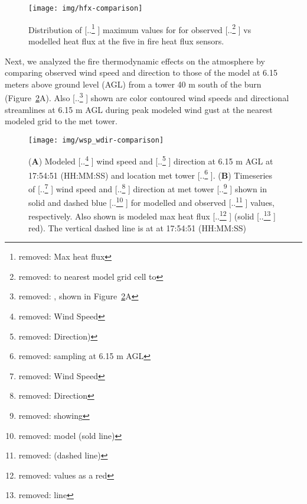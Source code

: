 \documentclass[preprints,article,accept,moreauthors,pdftex]{Definitions/mdpi}
\providecommand{\DIFadd}[1]{{\protect\color{blue} \sf #1}} %
\providecommand{\DIFdel}[1]{{\protect\color{red} [..\footnote{removed: #1} ]}} %
\providecommand{\DIFaddbegin}{} %
\providecommand{\DIFaddend}{} %
\providecommand{\DIFdelbegin}{} %
\providecommand{\DIFdelend}{} %
\providecommand{\DIFaddFL}[1]{\DIFadd{#1}} %
\providecommand{\DIFdelFL}[1]{\DIFdel{#1}} %
\providecommand{\DIFaddbeginFL}{} %
\providecommand{\DIFaddendFL}{} %
\providecommand{\DIFdelbeginFL}{} %
\providecommand{\DIFdelendFL}{} %
\begin{document}
\begin{figure}[H]
\centering
 \texttt{[image: img/hfx-comparison]}
 \caption{Distribution of \DIFdelbeginFL \DIFdelFL{Max heat flux }\DIFdelendFL \DIFaddbeginFL \DIFaddFL{maximum values }\DIFaddendFL for \DIFaddbeginFL \DIFaddFL{for }\DIFaddendFL observed \DIFdelbeginFL \DIFdelFL{to nearest model grid cell to }\DIFdelendFL \DIFaddbeginFL \DIFaddFL{vs modelled heat flux at }\DIFaddendFL the five in fire heat flux sensors.\label{fig6}}
 \end{figure}

Next, we analyzed the fire thermodynamic effects on the atmosphere by comparing observed wind speed and direction to those of the model at 6.15 meters above ground level (AGL) from a tower 40 m south of the burn (Figure~\ref{fig7}A). Also \DIFdelbegin \DIFdel{, shown in Figure~\ref{fig7}A }\DIFdelend \DIFaddbegin \DIFadd{shown }\DIFaddend are color contoured wind speeds and directional streamlines at 6.15 m AGL during peak modeled wind gust at the nearest modeled grid to the met tower.

\begin{figure}[H]
\centering
 \texttt{[image: img/wsp\_wdir-comparison]}
 \caption{(\textbf{A}) Modeled \DIFdelbeginFL \DIFdelFL{Wind Speed }\DIFdelendFL \DIFaddbeginFL \DIFaddFL{wind speed }\DIFaddendFL and \DIFdelbeginFL \DIFdelFL{Direction) }\DIFdelendFL \DIFaddbeginFL \DIFaddFL{direction at }\DIFaddendFL 6.15 m AGL at 17:54:51 (HH:MM:SS) and location met tower\DIFdelbeginFL \DIFdelFL{sampling at 6.15 m AGL}\DIFdelendFL . (\textbf{B}) Timeseries of \DIFdelbeginFL \DIFdelFL{Wind Speed }\DIFdelendFL \DIFaddbeginFL \DIFaddFL{wind speed }\DIFaddendFL and \DIFdelbeginFL \DIFdelFL{Direction }\DIFdelendFL \DIFaddbeginFL \DIFaddFL{direction }\DIFaddendFL at met tower \DIFdelbeginFL \DIFdelFL{showing }\DIFdelendFL \DIFaddbeginFL \DIFaddFL{shown }\DIFaddendFL in \DIFaddbeginFL \DIFaddFL{solid and dashed }\DIFaddendFL blue \DIFdelbeginFL \DIFdelFL{model (sold line) }\DIFdelendFL \DIFaddbeginFL \DIFaddFL{for modelled }\DIFaddendFL and observed \DIFdelbeginFL \DIFdelFL{(dashed line)}\DIFdelendFL \DIFaddbeginFL \DIFaddFL{values, respectively}\DIFaddendFL . Also shown is modeled max heat flux \DIFdelbeginFL \DIFdelFL{values as a red }\DIFdelendFL \DIFaddbeginFL \DIFaddFL{(}\DIFaddendFL solid \DIFdelbeginFL \DIFdelFL{line}\DIFdelendFL \DIFaddbeginFL \DIFaddFL{red)}\DIFaddendFL . The vertical dashed line is at at 17:54:51 (HH:MM:SS)\label{fig7}}
 \end{figure}
\end{document}
